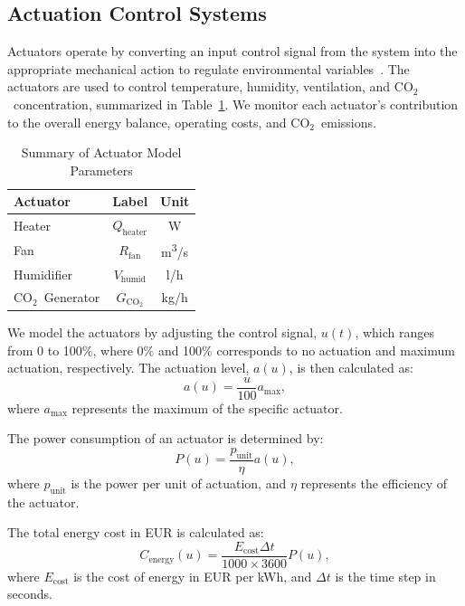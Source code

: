 \documentclass[conference]{IEEEtran}
\newcommand{\coo}{\ensuremath{\mathrm{CO_2}}}
\begin{document}
\subsection{Actuation Control Systems}
Actuators operate by converting an input control signal from the system into the appropriate mechanical action to regulate environmental variables~\cite{Butterfield2018}. The actuators are used to control temperature, humidity, ventilation, and \coo\ concentration, summarized in Table~\ref{tab:actuators}. We monitor each actuator's contribution to the overall energy balance, operating costs, and \coo\ emissions.

\begin{table}
    \centering
    \caption{Summary of Actuator Model Parameters}\label{tab:actuators}
    \begin{tabular}{lcc}
        \toprule
        Actuator        & Label                   & Unit                   \\
        \midrule
        Heater          & \( Q_{\text{heater}} \) & W                      \\
        Fan             & \( R_{\text{fan}} \)    & m\textsuperscript{3}/s \\
        Humidifier      & \( V_{\text{humid}} \)  & l/h                    \\
        \coo\ Generator & \( G_{\coo} \)          & kg/h                   \\
        \bottomrule
    \end{tabular}
\end{table}

We model the actuators by adjusting the control signal, \( u(t) \), which ranges from 0 to 100\%, where 0\% and 100\% corresponds to no actuation and maximum actuation, respectively. The actuation level, \( a(u) \), is then calculated as:
\begin{equation}
    a(u) = \frac{u}{100}  a_{\text{max}},
\end{equation}
where \( a_{\text{max}} \) represents the maximum of the specific actuator.

The power consumption of an actuator is determined by:
\begin{equation}
    P(u) = \frac{p_{\text{unit}}}{\eta}  a(u),
\end{equation}
where \( p_{\text{unit}} \) is the power per unit of actuation, and \( \eta \) represents the efficiency of the actuator.

The total energy cost in EUR is calculated as:
\begin{equation}
    C_{\text{energy}}(u) = \frac{E_{\text{cost}}  \Delta t}{1000 \times 3600}  P(u),
\end{equation}
where \( E_{\text{cost}} \) is the cost of energy in EUR per kWh, and \( \Delta t \) is the time step in seconds.
\end{document}
